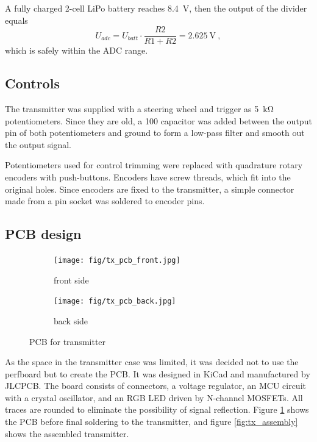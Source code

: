 A fully charged 2-cell LiPo battery reaches \SI{8.4}{\V}, then the output of the divider equals
\begin{equation}
	U_{adc} = U_{batt} \cdot \frac{R2}{R1+R2} = \SI{2.625}{\V}\ ,
\end{equation}
which is safely within the ADC range.

\subsection{Controls}
The transmitter was supplied with a steering wheel and trigger as \SI{5}{\kohm} potentiometers. Since they are old, a \SI{100}{\nF} capacitor was added between the output pin of both potentiometers and ground to form a low-pass filter and smooth out the output signal.

Potentiometers used for control trimming were replaced with quadrature rotary encoders with push-buttons. Encoders have screw threads, which fit into the original holes. Since encoders are fixed to the transmitter, a simple connector made from a pin socket was soldered to encoder pins.

\subsection{PCB design}
    \begin{figure}[b]
    \centering
    \begin{subfigure}{0.495\textwidth}
    \centering
        \texttt{[image: fig/tx\_pcb\_front.jpg]}
		\caption{front side}
    \end{subfigure}%
    \hfill
    \begin{subfigure}{0.495\textwidth}
    \centering
		\texttt{[image: fig/tx\_pcb\_back.jpg]}
		\caption{back side}
    \end{subfigure}
	\caption{PCB for transmitter}
    \label{fig:tx_pcb}
    \end{figure}

As the space in the transmitter case was limited, it was decided not to use the perfboard but to create the PCB. It was designed in KiCad and manufactured by JLCPCB. The board consists of connectors, a voltage regulator, an MCU circuit with a crystal oscillator, and an RGB LED driven by N-channel MOSFETs. All traces are rounded to eliminate the possibility of signal reflection. Figure \ref{fig:tx_pcb} shows the PCB before final soldering to the transmitter, and figure \ref{fig:tx_assembly} shows the assembled transmitter.

